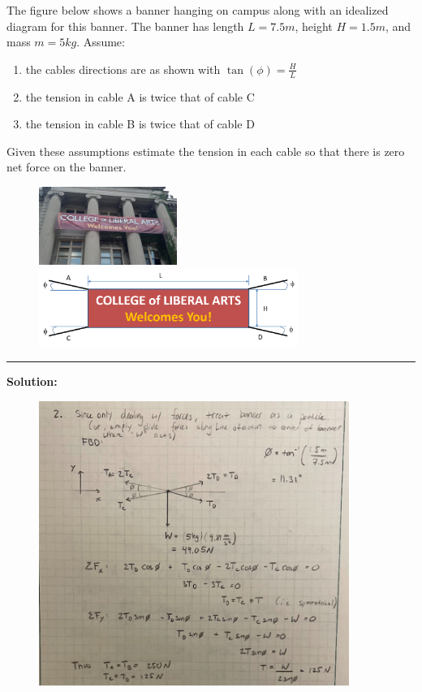 

The figure below shows a banner hanging on campus along with an idealized diagram for this banner. The banner has length $L = 7.5m$, height $H = 1.5m$, and mass $m = 5kg$. Assume:
\begin{enumerate}
  \item the cables directions are as shown with $\tan(\phi) = \frac{H}{L}$
  \item the tension in cable A is twice that of cable C
  \item the tension in cable B is twice that of cable D
\end{enumerate}
Given these assumptions estimate the tension in each cable so that there is zero net force on the banner.

\begin{figure}[ht!]
  \centering
  \includegraphics[height=1.0in]{figa.png}
  \includegraphics[height=1.0in]{figb.png}
\end{figure}

\vspace{.5cm}
\rule{\textwidth}{.4pt}
\vspace{.5cm}
\textbf{Solution:}
\begin{figure}[ht!]
  \centering
  \includegraphics[width=0.9\textwidth,
	           height=0.4\textheight,
		   keepaspectratio]{soln.png}
\end{figure}

